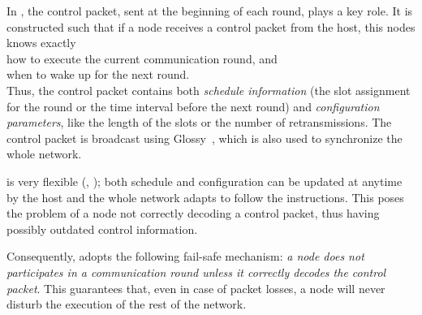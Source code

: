 
In \baloo, the control packet, sent at the beginning of each round, plays a key role. It is constructed such that if a node receives a control packet from the host, this nodes knows exactly\\
	\inlineitem how to execute the current communication round, and\\
	\inlineitem when to wake up for the next round.\\
Thus, the control packet contains both \textsl{schedule information} (\eg the slot assignment for the round or the time interval before the next round) and \textsl{configuration parameters}, like the length of the slots or the number of retransmissions.
The control packet is broadcast using Glossy~\cite{ferrari2011Glossy}, which is also used to synchronize the whole network.

\baloo is very flexible (, ); both schedule and configuration can be updated at anytime by the host and the whole network adapts to follow the instructions.
This poses the problem of a node not correctly decoding a control packet, thus having possibly outdated control information.

Consequently, \baloo adopts the following fail-safe mechanism: \textsl{a node does not participates in a communication round unless it correctly decodes the control packet}. This guarantees that, even in case of packet losses, a node will never disturb the execution of the rest of the network.

